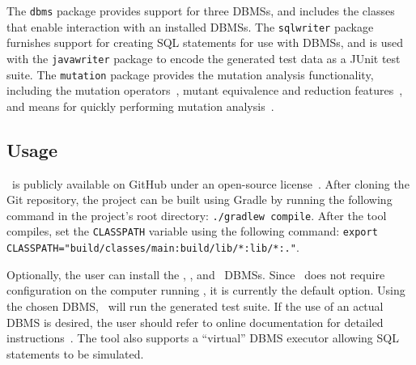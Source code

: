 
The \texttt{dbms} package provides support for three DBMSs, and includes the classes that enable interaction with an
installed DBMSs. The \texttt{sqlwriter} package furnishes support for creating SQL statements for use with DBMSs, and is
used with the \texttt{javawriter} package to encode the generated test data as a JUnit test suite.  The
\texttt{mutation} package provides the mutation analysis functionality, including the mutation
operators~\cite{wright2015mutation}, mutant equivalence and reduction features~\cite{wright2014impact}, and means for
quickly performing mutation analysis~\cite{mcminn2016virtual}.

\subsection{Usage}



\sa~is publicly available on GitHub under an open-source license~\cite{tool}. After cloning the Git
repository, the project can be built using Gradle by running the following command in the project's root directory:
\lstinline{./gradlew compile}. After the tool compiles, set the \lstinline{CLASSPATH} variable using the following
command: \lstinline{export CLASSPATH="build/classes/main:build/lib/*:lib/*:."}.


Optionally, the user can install the \postgres, \sqlite, and \hypersql~DBMSs. Since \sqlite~does not require
configuration on the computer running \sa, it is currently the default option. Using the chosen DBMS, \sa~will run the
generated test suite. If the use of an actual DBMS is desired, the user should refer to online documentation for detailed
instructions~\cite{tool}. The tool also supports a ``virtual'' DBMS executor allowing SQL statements to be simulated.




